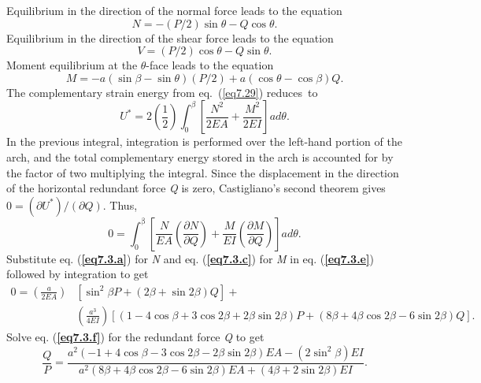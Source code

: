 \documentclass{AeroStructure-ERJohnson}
\begin{document}
\begin{example}
Equilibrium in the direction of the normal force leads to the equation
\begin{equation}
N=-(P / 2) \sin \theta-Q \cos \theta. \label{eq7.3.a}\tag{a}
\end{equation}
Equilibrium in the direction of the shear force leads to the equation
\begin{equation}
V=(P / 2) \cos \theta-Q \sin \theta. \label{eq7.3.b}\tag{b}
\end{equation}
Moment equilibrium at the $\theta$-face leads to the equation
\begin{equation}
M=-a(\sin \beta-\sin \theta)(P / 2)+a(\cos \theta-\cos \beta) Q. \label{eq7.3.c}\tag{c}
\end{equation}
The complementary strain energy from eq.~(\ref{eq7.29}) redu\-ces~\vspace*{10pt}to
\begin{equation}
U^{*}=2\left(\frac{1}{2}\right) \int_{0}^{\beta}\left[\frac{N^{2}}{2 E A}+\frac{M^{2}}{2 E I}\right] a d \theta. \label{eq7.3.d}\tag{d}
\end{equation}
In the previous integral, integration is performed over the left-hand portion of the arch, and the total complementary energy stored in the arch is accounted for by the factor of two multiplying the integral. Since the displacement in the direction of the horizontal redundant force \textit{Q} is zero, Castigliano's second theorem gives $0=\left(\partial U^{*}\right) /(\partial Q)$. Thus,
\begin{equation}
0=\int_{0}^{\mathrm{\beta}}\left[\frac{N}{E A}\left(\frac{\partial N}{\partial Q}\right)+\frac{M}{E I}\left(\frac{\partial M}{\partial Q}\right)\right] a d \theta. \label{eq7.3.e}\tag{e}
\end{equation}
Substitute eq. (\textbf{\ref{eq7.3.a}}) for \textit{N} and eq. (\textbf{\ref{eq7.3.c}}) for \textit{M} in eq. (\textbf{\ref{eq7.3.e}}) followed by integration to get
\begin{align}
0=\left(\frac{a}{2 E A}\right) &\left[\sin ^{2} \beta P+(2 \beta+\sin 2 \beta) Q\right]+ \nonumber\\
&\left(\frac{a^{3}}{4 E I}\right)[(1-4 \cos \beta+3 \cos 2 \beta+2 \beta \sin 2 \beta) P+(8 \beta+4 \beta \cos 2 \beta-6 \sin 2 \beta) Q]. \label{eq7.3.f}\tag{f}
\end{align}
Solve eq. (\textbf{\ref{eq7.3.f}}) for the redundant force \textit{Q} to get
\begin{equation}
\frac{Q}{P}=\frac{a^{2}(-1+4 \cos \beta-3 \cos 2 \beta-2 \beta \sin 2 \beta) E A-\left(2 \sin ^{2} \beta\right) E I}{a^{2}(8 \beta+4 \beta \cos 2 \beta-6 \sin 2 \beta) E A+(4 \beta+2 \sin 2 \beta) E I}. \label{eq7.3.g}\tag{g}
\end{equation}


\end{example}
\end{document}
